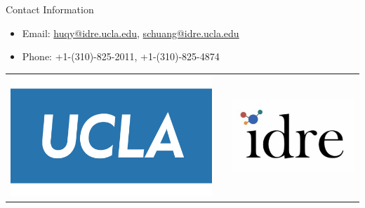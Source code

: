 \documentclass[final]{beamer}
\newlength{\onecolwid}
\begin{document}
\begin{frame}[t]
\begin{columns}[t]
\begin{column}{\onecolwid}


\begin{alertblock}{Contact Information}

\begin{itemize}
\item Email: \href{mailto:huqy@idre.ucla.edu}{huqy@idre.ucla.edu}, \href{mailto:schuang@idre.ucla.edu}{schuang@idre.ucla.edu}
\item Phone: +1-(310)-825-2011, +1-(310)-825-4874
\end{itemize}

\end{alertblock}

\vspace{-1em}
\begin{center}
\begin{tabular}{ccc}
\includegraphics[width=0.4\linewidth]{figures/ucla_logo.pdf} & \hfill & \includegraphics[width=0.4\linewidth]{figures/idre_logo.pdf}
\end{tabular}
\end{center}

\end{column} %


\end{columns} %

\end{frame} %
\end{document}
